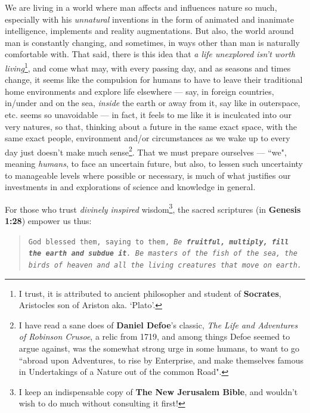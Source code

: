 \documentclass[a4paper, 18pt]{book} %
\begin{document}
We are living in a world where man affects and influences nature so much, especially with his \textit{unnatural} inventions in the form of animated and inanimate intelligence, implements and reality augmentations. But also, the world around man is constantly changing, and sometimes, in ways other than man is naturally comfortable with. That said, there is this idea that \textit{a life unexplored isn't worth living}\footnote{I trust, it is attributed to ancient philosopher and student of \textbf{Socrates}, Aristocles son of Ariston aka. `Plato'.}, and come what may, with every passing day, and as seasons and times change, it seems like the compulsion for humans to have to leave their traditional home environments and explore life elsewhere --- say, in foreign countries, in/under and on the sea, \textit{inside} the earth or away from it, say like in outerspace, etc. seems so unavoidable --- in fact, it feels to me like it is inculcated into our very natures, so that, thinking about a future in the same exact space, with the same exact people, environment and/or circumstances as we wake up to every day just doesn't make much sense\footnote{I have read a sane does of \textbf{Daniel Defoe}'s classic, \textit{The Life and Adventures of Robinson Crusoe}, a relic from 1719, and among things Defoe seemed to argue against, was the somewhat strong urge in some humans, to want to go ``abroad upon Adventures, to rise by Enterprise, and make themselves famous in Undertakings of a Nature out of the common Road".}. That we must prepare ourselves --- ``we", meaning \textit{humans}, to face an uncertain future, but also, to lessen such uncertainty to manageable levels where possible or necessary, is much of what justifies our investments in and explorations of science and knowledge in general. 

For those who trust \textit{divinely inspired} wisdom\footnote{I keep an indispensable copy of \textbf{The New Jerusalem Bible}, and wouldn't wish to do much without consulting it first!}, the sacred scriptures (in \textbf{Genesis 1:28}) empower us thus:\\

\begin{quotation}
\noindent \texttt{God blessed them, saying to them, \textit{Be \textbf{fruitful, multiply, fill the earth and subdue it}. Be masters of the fish of the sea, the birds of heaven and all the living creatures that move on earth.}}\\
\end{quotation}
\end{document}
